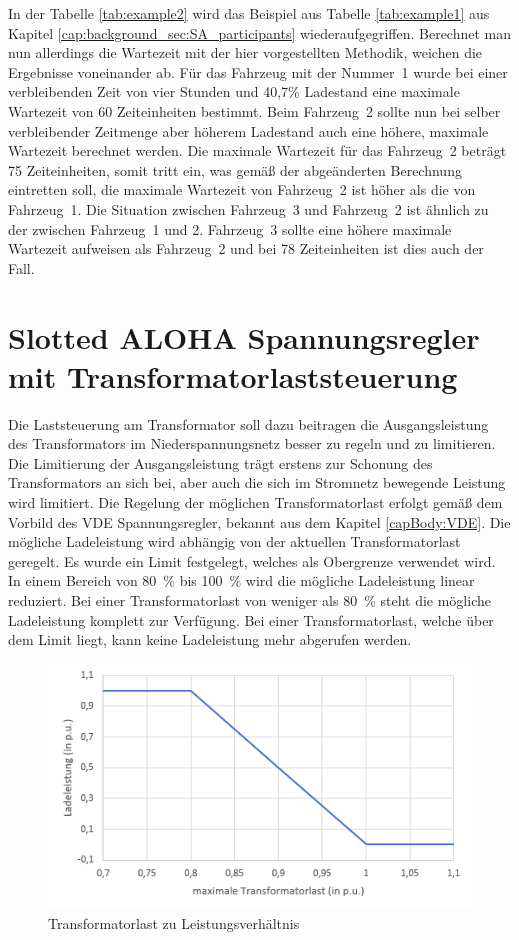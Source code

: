 In der Tabelle \ref{tab:example2} wird das Beispiel aus Tabelle \ref{tab:example1} aus Kapitel \ref{cap:background_sec:SA_participants} wiederaufgegriffen. Berechnet man nun allerdings die Wartezeit mit der hier vorgestellten Methodik, weichen die Ergebnisse voneinander ab. Für das Fahrzeug mit der Nummer~1 wurde bei einer verbleibenden Zeit von vier Stunden und 40,7\% Ladestand eine maximale Wartezeit von 60 Zeiteinheiten bestimmt. Beim Fahrzeug~2 sollte nun bei selber verbleibender Zeitmenge aber höherem Ladestand auch eine höhere, maximale Wartezeit berechnet werden. Die maximale Wartezeit für das Fahrzeug~2 beträgt 75 Zeiteinheiten, somit tritt ein, was gemäß der abgeänderten Berechnung eintretten soll, die maximale Wartezeit von Fahrzeug~2 ist höher als die von Fahrzeug~1. Die Situation zwischen Fahrzeug~3 und Fahrzeug~2 ist ähnlich zu der zwischen Fahrzeug~1 und 2. Fahrzeug~3 sollte eine höhere maximale Wartezeit aufweisen als Fahrzeug~2 und bei 78 Zeiteinheiten ist dies auch der Fall.  

\section{Slotted ALOHA Spannungsregler mit Transformatorlaststeuerung}
Die Laststeuerung am Transformator soll dazu beitragen die Ausgangsleistung des Transformators im Niederspannungsnetz besser zu regeln und zu limitieren. Die Limitierung der Ausgangsleistung trägt erstens zur Schonung des Transformators an sich bei, aber auch die sich im Stromnetz bewegende Leistung wird limitiert. Die Regelung der möglichen Transformatorlast erfolgt gemäß dem Vorbild des VDE Spannungsregler, bekannt aus dem Kapitel \ref{capBody:VDE}. Die mögliche Ladeleistung wird abhängig von der aktuellen Transformatorlast geregelt. Es wurde ein Limit festgelegt, welches als Obergrenze verwendet wird. In einem Bereich von 80~\% bis 100~\% wird die mögliche Ladeleistung linear reduziert. Bei einer Transformatorlast von weniger als 80~\% steht die mögliche Ladeleistung komplett zur Verfügung. Bei einer Transformatorlast, welche über dem Limit liegt, kann keine Ladeleistung mehr abgerufen werden.  \\
\begin{figure}[htb]
	\includegraphics[width = \linewidth]{img/TrafoGraph1.png}
	\caption{Transformatorlast zu Leistungsverhältnis}
	\label{SATrafo:Graph}
\end{figure}

